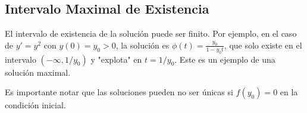\subsection{Intervalo Maximal de Existencia}
El intervalo de existencia de la solución puede ser finito. Por ejemplo, en el caso de $y' = y^2$ con $y(0) = y_0 > 0$, la solución es $\phi(t) = \frac{y_0}{1-y_0t}$, que solo existe en el intervalo $(-\infty, 1/y_0)$ y "explota" en $t = 1/y_0$. Este es un ejemplo de una solución maximal.

Es importante notar que las soluciones pueden no ser únicas si $f(y_0)=0$ en la condición inicial.
